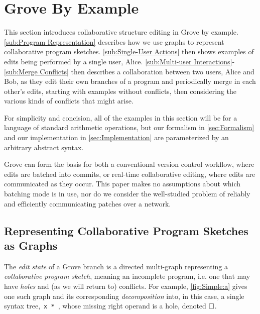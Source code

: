 
\section{Grove By Example}%
\label{sec:Grove By Example}

This section introduces collaborative structure editing in Grove by example.
\autoref{sub:Program Representation} describes how we use graphs to represent collaborative program sketches. 
\autoref{sub:Single-User Actions} then shows examples of edits being performed by a single user, Alice. 
\autoref{sub:Multi-user Interactions}-\ref{sub:Merge Conflicts} then describes a collaboration between two users, Alice and Bob,
as they edit their own branches of a program and periodically merge in each other's edits, starting with examples without conflicts, then considering the various kinds of conflicts that might arise.

For simplicity and concision, all of the examples in this section will be for a 
language of standard arithmetic operations, 
but our formalism in \autoref{sec:Formalism} and our implementation in \autoref{sec:Implementation} are parameterized by an arbitrary abstract syntax.

\figureSimple


Grove can form the basis for both a conventional version control workflow,
where edits are batched into commits, or real-time collaborative editing, 
where edits are communicated as they occur. This paper makes no assumptions about which batching mode is in use, nor do we consider the well-studied problem of reliably and efficiently communicating patches over a network. 

\subsection{Representing Collaborative Program Sketches as Graphs}%
\label{sub:Program Representation}

The \textit{edit state} of a Grove branch is a directed multi-graph representing a \emph{collaborative program sketch}, meaning an incomplete program, i.e. one that may have \emph{holes} and (as we will return to) conflicts. 
For example, \autoref{fig:Simple:a} gives one such graph and its corresponding \emph{decomposition} into, in this case, a single syntax tree,~\texttt{x * \hole},
whose missing right operand is a hole, denoted $\square$.

